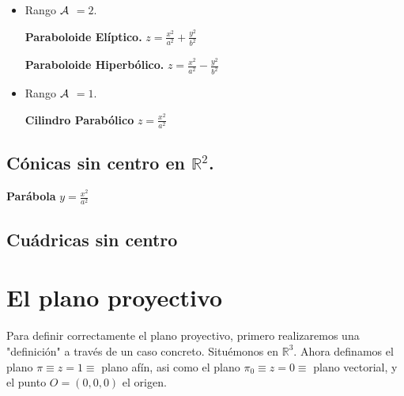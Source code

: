 \documentclass[11pt, a4paper, titlepage]{article}
\theoremstyle{theorem-style}
\theoremstyle{definition-style}
\theoremstyle{remark-style}
\theoremstyle{example-style}
\begin{document}
\begin{itemize}

\item {Rango $\cal A$ $=2$.}



{\bf Paraboloide El\'iptico.}    \hspace{2.7cm}   $z = \frac{x^2}{a^2} + \frac{y^2}{b^2}$

\vspace{.2cm}

{\bf Paraboloide Hiperb\'olico.}    \hspace{2cm}   $z = \frac{x^2}{a^2} - \frac{y^2}{b^2}$



\vspace{0.5cm}

\item {Rango $\cal A$ $=1$.}


{\bf Cilindro Parab\'olico}    \hspace{3.3cm}   $z = \frac{x^2}{a^2}$ 

\end{itemize}

\subsection{\bf C\'onicas sin centro en $\mathbb{R}^2$.}



{\bf Par\'abola} \hspace{5.5cm}  $y = \frac{x^2}{a^2}$



\subsection{Cuádricas sin centro}

\section{El plano proyectivo}

Para definir correctamente el plano proyectivo, primero realizaremos una "definición" a través de un caso concreto. Situémonos en $\mathbb{R}^3$. Ahora definamos el plano $\pi \equiv z = 1 \equiv$ plano afín, asi como el plano $\pi_0 \equiv z = 0 \equiv$ plano vectorial, y el punto $O = (0,0,0)$ el origen.
\end{document}
